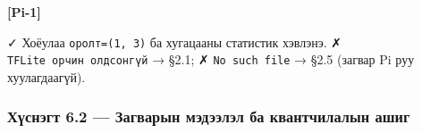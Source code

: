 \textbf{{[}Pi-1{]}}

\begin{Shaded}
\begin{Highlighting}[]
 \KeywordTok{\textbackslash{}}
    \KeywordTok{\textbackslash{}}
 \KeywordTok{\textbackslash{}}
    \KeywordTok{\textbackslash{}}
\end{Highlighting}
\end{Shaded}

✓ Хоёулаа \texttt{оролт=(1,\ 3)} ба хугацааны статистик хэвлэнэ. ✗ \texttt{TFLite\ орчин\ олдсонгүй} → §2.1; ✗ \texttt{No\ such\ file} → §2.5 (загвар Pi руу хуулагдаагүй).

\hypertarget{ux445ux4afux441ux43dux44dux433ux442-6.2-ux437ux430ux433ux432ux430ux440ux44bux43d-ux43cux44dux434ux44dux44dux43bux44dux43b-ux431ux430-ux43aux432ux430ux43dux442ux447ux438ux43bux430ux43bux44bux43d-ux430ux448ux438ux433}{%
\subsubsection{Хүснэгт 6.2 --- Загварын мэдээлэл ба квантчилалын ашиг}\label{ux445ux4afux441ux43dux44dux433ux442-6.2-ux437ux430ux433ux432ux430ux440ux44bux43d-ux43cux44dux434ux44dux44dux43bux44dux43b-ux431ux430-ux43aux432ux430ux43dux442ux447ux438ux43bux430ux43bux44bux43d-ux430ux448ux438ux433}}

